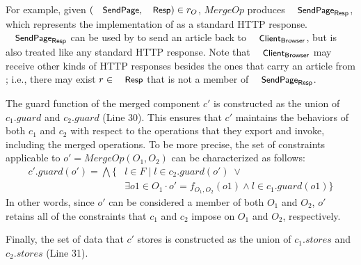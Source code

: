 For example, given $(\txtcname{SendPage}, \txtcname{Resp}) \in r_{O}$,
$MergeOp$ produces $\txtcname{SendPage}_{\textsf{Resp}}$, which
represents the implementation of  as a standard HTTP
response.  $\txtcname{SendPage}_{\textsf{Resp}}$ can be used by
 to send an article back to
$\txtcname{Client}_\textsf{Browser}$, but is also treated like any
standard HTTP response. Note that $\txtcname{Client}_\textsf{Browser}$
may receive other kinds of HTTP responses besides the ones that carry
an article from ; i.e., there may exist $r \in
\txtcname{Resp}$ that is not a member of $\txtcname{SendPage}_{\textsf{Resp}}$.

The guard function of the merged component $c'$ is constructed
as the union of $c_{1}.guard$ and $c_{2}.guard$ (Line 30). This ensures that $c'$
maintains the behaviors of both $c_{1}$ and $c_{2}$ with respect to the
operations that they export and invoke, including the merged
operations. To be more precise, the set of constraints applicable to $o' =
MergeOp(O_{1}, O_{2})$ can be characterized as follows:
\begin{align*}
c'.guard(o') = \bigwedge \{& l \in F \;|\; l \in c_{2}.guard(o') \; \lor \\
&\exists o1 \in O_{1} 
\cdot o' = f_{O_{1}, O_{2}}(o1) \land l \in c_{1}.guard(o1) \} 
\end{align*}
In other words, since $o'$ can be considered a member of both $O_{1}$ and
$O_{2}$, $o'$ retains all of the constraints that $c_{1}$ and $c_{2}$ impose
on $O_{1}$ and $O_{2}$, respectively. 

Finally, the set of data that $c'$ stores is constructed as the union
of $c_{1}.stores$ and $c_{2}.stores$ (Line 31).




